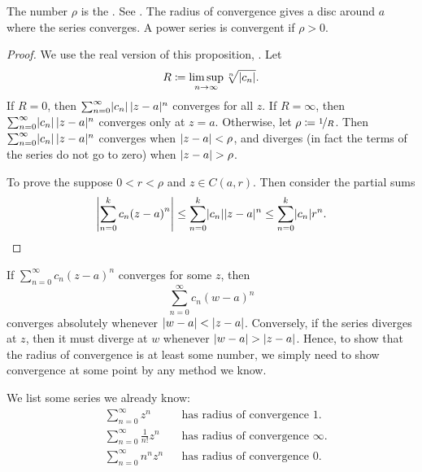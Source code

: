 The number $\rho$ is the \emph{}.
See .
The radius of convergence gives a disc around $a$ where the series converges.  A power series
is convergent if $\rho > 0$.
\begin{myfigureht}
\caption{Radius of convergence.\label{fig:radiusconvcomplex}}
\end{myfigureht}

\begin{proof}
We use the real version of this proposition,
.
Let
\begin{equation*}
R \coloneqq \limsup_{n\to\infty} \sqrt[n]{\lvert {c_n} \rvert} .
\end{equation*}
If $R = 0$, then
$\sum_{n=0}^\infty \lvert {c_n} \rvert \, \lvert {z-a} \rvert^n$ converges for all $z$.
If $R = \infty$, then
$\sum_{n=0}^\infty \lvert {c_n} \rvert \, \lvert {z-a} \rvert^n$ converges only at $z=a$.
Otherwise, let $\rho \coloneqq \nicefrac{1}{R}$.
Then
$\sum_{n=0}^\infty \lvert {c_n} \rvert \, \lvert {z-a} \rvert^n$ converges when
$\lvert {z-a} \rvert < \rho$, and diverges (in fact the terms of the series
do not go to zero) when $\lvert {z-a} \rvert > \rho$.

To prove the  suppose
$0 < r < \rho$ and $z \in C(a,r)$.  Then
consider the partial sums
\begin{equation*}
\left\lvert {\sum_{n=0}^k c_n {(z-a)}^n} \right\rvert
\leq
\sum_{n=0}^k \lvert {c_n} \rvert \lvert {z-a} \rvert^n
\leq
\sum_{n=0}^k \lvert {c_n} \rvert r^n . \qedhere
\end{equation*}
\end{proof}

If $\sum_{n=0}^\infty c_n {(z-a)}^n$ converges for some $z$, then
\begin{equation*}
\sum_{n=0}^\infty c_n {(w-a)}^n
\end{equation*}
converges absolutely whenever $\lvert {w-a} \rvert < \lvert {z-a} \rvert$.
Conversely, if the series diverges at $z$, then it must diverge at $w$
whenever $\lvert {w-a} \rvert > \lvert {z-a} \rvert$.
Hence, to show
that the radius of convergence is at least some number, we simply need to
show convergence at some point by any method we know.

\begin{example}
We list some series we already know:
\begin{align*}
& &
& \sum_{n=0}^\infty z^n
& & \text{has radius of convergence } 1.
& &
\\
& &
& \sum_{n=0}^\infty \frac{1}{n!} z^n
& & \text{has radius of convergence } \infty.
& &
\\
& &
& \sum_{n=0}^\infty n^n z^n
& & \text{has radius of convergence } 0.
& &
\end{align*}
\end{example}


